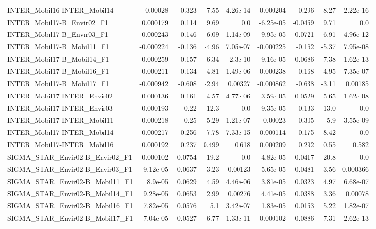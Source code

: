 \begin{tabular}{lrrrrrrrr}
INTER_Mobil16-INTER_Mobil14 & 0.00028 & 0.323 & 7.55 & 4.26e-14 & 0.000204 & 0.296 & 8.27 & 2.22e-16 \\
INTER_Mobil17-B_Envir02_F1 & 0.000179 & 0.114 & 9.69 & 0.0 & -6.25e-05 & -0.0459 & 9.71 & 0.0 \\
INTER_Mobil17-B_Envir03_F1 & -0.000243 & -0.146 & -6.09 & 1.14e-09 & -9.95e-05 & -0.0721 & -6.91 & 4.96e-12 \\
INTER_Mobil17-B_Mobil11_F1 & -0.000224 & -0.136 & -4.96 & 7.05e-07 & -0.000225 & -0.162 & -5.37 & 7.95e-08 \\
INTER_Mobil17-B_Mobil14_F1 & -0.000259 & -0.157 & -6.34 & 2.3e-10 & -9.16e-05 & -0.0686 & -7.38 & 1.62e-13 \\
INTER_Mobil17-B_Mobil16_F1 & -0.000211 & -0.134 & -4.81 & 1.49e-06 & -0.000238 & -0.168 & -4.95 & 7.35e-07 \\
INTER_Mobil17-B_Mobil17_F1 & -0.000942 & -0.608 & -2.94 & 0.00327 & -0.000862 & -0.638 & -3.11 & 0.00185 \\
INTER_Mobil17-INTER_Envir02 & -0.000136 & -0.161 & -4.57 & 4.77e-06 & 3.59e-05 & 0.0529 & -5.65 & 1.62e-08 \\
INTER_Mobil17-INTER_Envir03 & 0.000193 & 0.22 & 12.3 & 0.0 & 9.35e-05 & 0.133 & 13.0 & 0.0 \\
INTER_Mobil17-INTER_Mobil11 & 0.000218 & 0.25 & -5.29 & 1.21e-07 & 0.00023 & 0.305 & -5.9 & 3.55e-09 \\
INTER_Mobil17-INTER_Mobil14 & 0.000217 & 0.256 & 7.78 & 7.33e-15 & 0.000114 & 0.175 & 8.42 & 0.0 \\
INTER_Mobil17-INTER_Mobil16 & 0.000192 & 0.237 & 0.499 & 0.618 & 0.000209 & 0.292 & 0.55 & 0.582 \\
SIGMA_STAR_Envir02-B_Envir02_F1 & -0.000102 & -0.0754 & 19.2 & 0.0 & -4.82e-05 & -0.0417 & 20.8 & 0.0 \\
SIGMA_STAR_Envir02-B_Envir03_F1 & 9.12e-05 & 0.0637 & 3.23 & 0.00123 & 5.65e-05 & 0.0481 & 3.56 & 0.000366 \\
SIGMA_STAR_Envir02-B_Mobil11_F1 & 8.9e-05 & 0.0629 & 4.59 & 4.46e-06 & 3.81e-05 & 0.0323 & 4.97 & 6.68e-07 \\
SIGMA_STAR_Envir02-B_Mobil14_F1 & 9.28e-05 & 0.0653 & 2.99 & 0.00276 & 4.41e-05 & 0.0388 & 3.36 & 0.00078 \\
SIGMA_STAR_Envir02-B_Mobil16_F1 & 7.82e-05 & 0.0576 & 5.1 & 3.42e-07 & 1.83e-05 & 0.0153 & 5.22 & 1.82e-07 \\
SIGMA_STAR_Envir02-B_Mobil17_F1 & 7.04e-05 & 0.0527 & 6.77 & 1.33e-11 & 0.000102 & 0.0886 & 7.31 & 2.62e-13 \\

\end{tabular}
